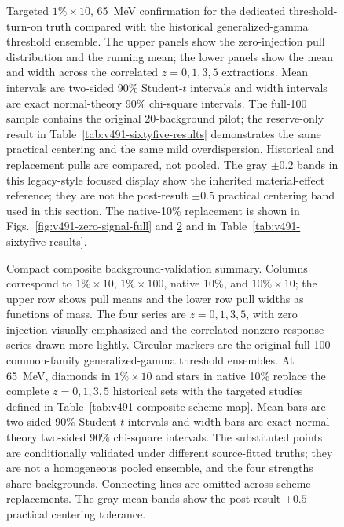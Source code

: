 \begin{figure}[p]
\centering
{}
\caption{Targeted $1\%\times10$, 65~MeV confirmation for the dedicated
threshold-turn-on truth compared with the historical generalized-gamma threshold
ensemble.  The upper panels show the zero-injection pull
distribution and the running mean; the lower panels show the mean and width across
the correlated $z=0,1,3,5$ extractions.  Mean intervals are two-sided 90\%
Student-$t$ intervals and width intervals are exact normal-theory 90\% chi-square
intervals.  The full-100 sample contains the original 20-background pilot; the
reserve-only result in Table~\ref{tab:v491-sixtyfive-results} demonstrates the same
practical centering and the same mild overdispersion.  Historical and replacement pulls are compared, not
pooled.  The gray $\pm0.2$ bands in this legacy-style focused display show the
inherited material-effect reference; they are not the post-result $\pm0.5$ practical
centering band used in this section.  The native-10\% replacement is shown in Figs.~\ref{fig:v491-zero-signal-full}
and \ref{fig:v491-pull-summary} and in Table~\ref{tab:v491-sixtyfive-results}.}
\label{fig:v491-sixtyfive-confirmation}
\end{figure}

\begin{figure}[p]
\centering
{}
\caption{Compact composite background-validation summary.  Columns correspond to
$1\%\times10$, $1\%\times100$, native 10\%, and $10\%\times10$; the upper row
shows pull means and the lower row pull widths as functions of mass.  The four series
are $z=0,1,3,5$, with zero injection visually emphasized and the correlated nonzero
response series drawn more lightly.  Circular markers are the original full-100
common-family generalized-gamma threshold ensembles.  At 65~MeV, diamonds in
$1\%\times10$ and stars in native 10\% replace the complete $z=0,1,3,5$
historical sets with the targeted studies defined in
Table~\ref{tab:v491-composite-scheme-map}.  Mean bars are
two-sided 90\% Student-$t$ intervals and width bars are exact normal-theory two-sided
90\% chi-square intervals.  The substituted points are conditionally validated under
different source-fitted truths; they are not a homogeneous pooled ensemble, and the
four strengths share backgrounds.  Connecting lines are omitted across scheme
replacements.  The gray mean bands show the post-result $\pm0.5$ practical
centering tolerance.}
\label{fig:v491-pull-summary}
\end{figure}

